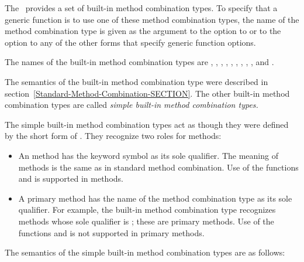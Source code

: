 The \CLOS\ provides a set of built-in method combination types.  To
specify that a generic function is to use one of these method
combination types, the name of the method combination type is given as
the argument to the  option to 
 or to the  option to any of the
other forms that specify generic function options.

The names of the built-in  method combination types are
\cdf{+}, , , , , , 
, , , and .

The semantics of the  built-in method combination type were
described in section~\ref{Standard-Method-Combination-SECTION}.  The other
built-in method combination types are called \emph{simple built-in method
combination types.}

The simple built-in method combination types act as though they were
defined by the short form of .  They
recognize two roles for methods:

\begin{itemize}

\item  An  method has the keyword symbol 
 as its sole qualifier.  The meaning of 
methods is the same as in standard method combination.  Use of the
functions  and  is supported
in  methods.

\item  A primary method has the name of the method combination
type as its sole qualifier.  For example, the built-in method
combination type  recognizes methods whose sole qualifier is
; these are primary methods. Use of the functions 
 and  is not supported in primary
methods.

\end{itemize}

The semantics of the simple built-in method combination types are as
follows:

